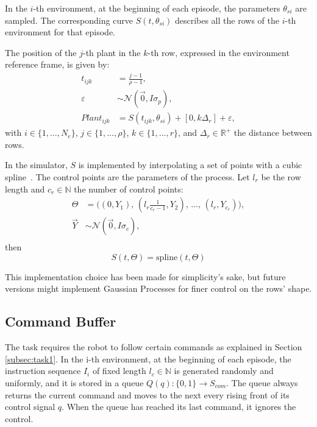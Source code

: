 \documentclass[11pt,a4paper,twocolumn]{article}
\begin{document}
In the \( i \)-th environment, at the beginning of each episode, 
the parameters \( \theta_{si} \) are sampled. 
The corresponding curve \( S(t, \theta_{si}) \) describes 
all the rows of the \( i \)-th environment for that episode.

The position of the \( j \)-th plant in the \( k \)-th row,
expressed in the environment reference frame, is given by:
\begin{align*}
    t_{ijk} &= \tfrac{j-1}{\rho-1}, \\
    \varepsilon &\sim \mathcal{N}(\vec{0}, I\sigma_p), \nonumber\\
    Plant_{ijk} &= S(t_{ijk}, \theta_{si}) + [0, k \Delta_r] + \varepsilon, \nonumber
\end{align*}
with \( i \in \{1,\!\dots,\!N_e\} \), 
\( j \in \{1,\!\dots,\!\rho\} \),
\( k \in \{1,\!\dots,\!r\} \),
and \( \Delta_r \in \mathbb{R}^+ \) the distance between rows.

In the simulator, \( S \) is implemented by interpolating a set of 
points with a cubic spline~\cite{Spline}. 
The control points are the parameters of the process. 
Let \( l_r \) be the row length and \( c_r \in \mathbb{N} \) 
the number of control points:
\begin{align*}
    \Theta &= \big((0, Y_1),\, 
        (l_r \tfrac{1}{c_r-1}, Y_2),\, \dots,\,
        (l_r, Y_{c_r})\big), \nonumber\\
    \vec{Y} &\sim \mathcal{N}(\vec{0}, I\sigma_c), \nonumber\\
\end{align*}
then 
$$
S(t, \Theta) = \text{spline}(t, \Theta)
$$

This implementation choice has been made for simplicity's sake, but future versions might implement Gaussian Processes for finer control on the rows' shape.

\subsection{Command Buffer}
The task requires the robot to follow certain commands as explained in Section \ref{subsec:task1}. In the i-th environment, at the beginning of each episode, the instruction sequence $I_i$ of fixed length $l_c \in \mathbb{N}$ is generated randomly and uniformly, and it is stored in a queue $Q(q):\{0,1\} \to S_{com}$. The queue always returns the current command and moves to the next every rising front of its control signal $q$. When the queue has reached its last command, it ignores the control.
\end{document}

